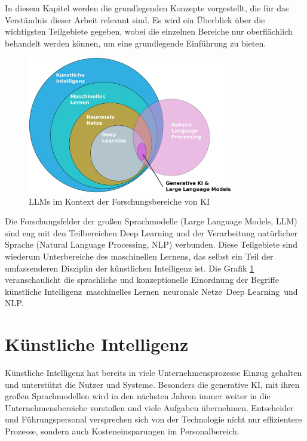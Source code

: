 In diesem Kapitel werden die grundlegenden Konzepte vorgestellt, die für das Verständnis dieser Arbeit relevant sind. Es wird ein Überblick über die wichtigsten Teilgebiete gegeben, wobei die einzelnen Bereiche nur oberflächlich behandelt werden können, um eine grundlegende Einführung zu bieten.

\begin{figure}[!ht]
	\includegraphics[width=0.8\textwidth]{content/chapter_basics/images/einordnung_bezeichnungen.eps}
	\centering
	\caption{LLMs im Kontext der Forschungsbereiche von KI}
	\label{img:classification_of_terms}
\end{figure}

Die Forschungsfelder der großen Sprachmodelle (Large Language Models, \acrshort{LLM}) sind eng mit den Teilbereichen Deep Learning und der Verarbeitung natürlicher Sprache (Natural Language Processing, \acrshort{NLP}) verbunden. Diese Teilgebiete sind wiederum Unterbereiche des maschinellen Lernens, das selbst ein Teil der umfassenderen Disziplin der künstlichen Intelligenz ist. Die Grafik \ref{img:classification_of_terms} veranschaulicht die sprachliche und konzeptionelle Einordnung der Begriffe \glqq künstliche Intelligenz\grqq \, \glqq maschinelles Lernen\grqq \, \glqq neuronale Netze\grqq \, \glqq Deep Learning\grqq \ und \glqq NLP\grqq .



\section{Künstliche Intelligenz}
Künstliche Intelligenz hat bereits in viele Unternehmensprozesse Einzug gehalten und unterstützt die Nutzer und Systeme. Besonders die generative KI, mit ihren großen Sprachmodellen wird in den nächsten Jahren immer weiter in die Unternehmensbereiche vorstoßen und viele Aufgaben übernehmen. Entscheider und Führungspersonal versprechen sich von der Technologie nicht nur effizientere Prozesse, sondern auch Kosteneinsparungen im Personalbereich.\vspace{0.2cm}

